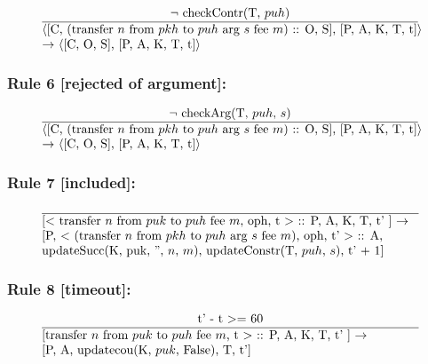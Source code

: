 \documentclass[a4paper]{llncs}
\begin{document}
\begin{equation}{}
\frac{\text{$\neg$ checkContr(T, $puh$)}}{\parbox{4.2in}{\text{$\langle$[C, (transfer ${n}$ from ${pkh}$ to  ${puh}$ arg ${s}$ fee ${m}$) :: O, S], [P, A, K, T, t]$\rangle$ }\\
\text{$\rightarrow$ $\langle$[C, O, S], [P, A, K, T, t]$\rangle$}}} 
\end{equation}

\subsubsection*{Rule 6 [rejected of argument]:}

\begin{equation}{}
\frac{\text{$\neg$ checkArg(T, $puh$, $s$)}}{\parbox{4.2in}{\text{$\langle$[C, (transfer ${n}$ from ${pkh}$ to  ${puh}$ arg ${s}$ fee ${m}$) :: O, S], [P, A, K, T, t]$\rangle$}\\
\text{$\rightarrow$ $\langle$[C, O, S], [P, A, K, T, t]$\rangle$}}} 
\end{equation}

\subsubsection*{Rule 7 [included]:}
\begin{equation}{}
\frac{}{\parbox{4.2in}{\text{[$<$ transfer $n$ from $puk$ to  $puh$ fee $m$, oph, t $>$ :: P, A, K, T, t' ] $\rightarrow$ } \\
\text{[P, $<$ (transfer ${n}$ from ${pkh}$ to  ${puh}$ arg ${s}$ fee ${m}$), oph, t' $>$ :: A, } \\
\text{updateSucc(K, puk, '', $n$, $m$), updateConstr(T, $puh$, $s$), t' + 1]}}} 
\end{equation}

\subsubsection*{Rule 8 [timeout]:}
\begin{equation}{}
\frac{\text{t' - t $>=$ 60}}{\parbox{4.2in}{\text{[transfer $n$ from $puk$ to  $puh$ fee $m$, t $>$ :: P, A, K, T, t' ] $\rightarrow$} \\
\text{[P, A, updatecou(K, $puk$, False), T, t']}}} 
\end{equation}
\end{document}
